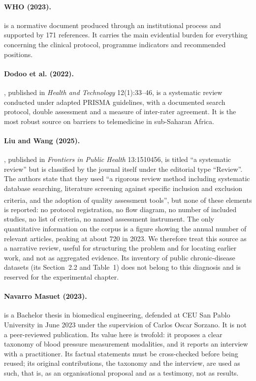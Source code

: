 \documentclass[12pt,a4paper,oneside]{report}
\newcommand{\bq}[1]{``#1''\textsuperscript{\dag}}
\begin{document}
\paragraph{WHO (2023).} \textcite{who2023hypertension} is a normative document produced through an institutional process and supported by 171 references. It carries the main evidential burden for everything concerning the clinical protocol, programme indicators and recommended positions.

\paragraph{Dodoo et al. (2022).} \textcite{dodoo2022}, published in \emph{Health and Technology} 12(1):33--46, is a systematic review conducted under adapted PRISMA guidelines, with a documented search protocol, double assessment and a measure of inter-rater agreement. It is the most robust source on barriers to telemedicine in sub-Saharan Africa.

\paragraph{Liu and Wang (2025).} \textcite{liu2025review}, published in \emph{Frontiers in Public Health} 13:1510456, is titled ``a systematic review'' but is classified by the journal itself under the editorial type ``Review''. The authors state that they used \bq{a rigorous review method including systematic database searching, literature screening against specific inclusion and exclusion criteria, and the adoption of quality assessment tools}, but none of these elements is reported: no protocol registration, no flow diagram, no number of included studies, no list of criteria, no named assessment instrument. The only quantitative information on the corpus is a figure showing the annual number of relevant articles, peaking at about 720 in 2023. We therefore treat this source as a narrative review, useful for structuring the problem and for locating earlier work, and not as aggregated evidence. Its inventory of public chronic-disease datasets (its Section~2.2 and Table~1) does not belong to this diagnosis and is reserved for the experimental chapter.

\paragraph{Navarro Masuet (2023).} \textcite{navarro2023} is a Bachelor thesis in biomedical engineering, defended at CEU San Pablo University in June 2023 under the supervision of Carlos Oscar Sorzano. It is not a peer-reviewed publication. Its value here is twofold: it proposes a clear taxonomy of blood pressure measurement modalities, and it reports an interview with a practitioner. Its factual statements must be cross-checked before being reused; its original contributions, the taxonomy and the interview, are used as such, that is, as an organisational proposal and as a testimony, not as results.
\end{document}
